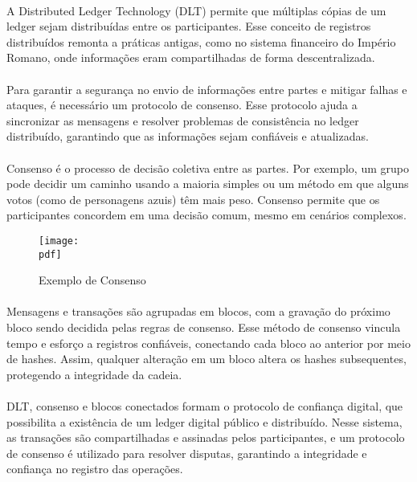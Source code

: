 \documentclass[letterpaper,11pt,leqno]{article}
\newcommand{\pdf}{figures/figures}
\begin{document}
\paragraph{}
A Distributed Ledger Technology (DLT) permite que múltiplas cópias de um ledger
sejam distribuídas entre os participantes. Esse conceito de registros
distribuídos remonta a práticas antigas, como no sistema financeiro do Império
Romano, onde informações eram compartilhadas de forma descentralizada.

\paragraph{}
Para garantir a segurança no envio de informações entre partes e mitigar falhas
e ataques, é necessário um protocolo de consenso. Esse protocolo ajuda a
sincronizar as mensagens e resolver problemas de consistência no ledger
distribuído, garantindo que as informações sejam confiáveis e atualizadas.

\paragraph{}
Consenso é o processo de decisão coletiva entre as partes. Por exemplo, um grupo
pode decidir um caminho usando a maioria simples ou um método em que alguns
votos (como de personagens azuis) têm mais peso. Consenso permite que os
participantes concordem em uma decisão comum, mesmo em cenários complexos.

\begin{figure}[H]
	{\texttt{[image: \\pdf]}}
	\caption{Exemplo de Consenso}
	\label{f:figure1}\end{figure}

\paragraph{}
Mensagens e transações são agrupadas em blocos, com a gravação do próximo bloco
sendo decidida pelas regras de consenso. Esse método de consenso vincula tempo e
esforço a registros confiáveis, conectando cada bloco ao anterior por meio de
hashes. Assim, qualquer alteração em um bloco altera os hashes subsequentes,
protegendo a integridade da cadeia.

\paragraph{}
DLT, consenso e blocos conectados formam o protocolo de confiança digital, que
possibilita a existência de um ledger digital público e distribuído. Nesse
sistema, as transações são compartilhadas e assinadas pelos participantes, e um
protocolo de consenso é utilizado para resolver disputas, garantindo a
integridade e confiança no registro das operações.
\end{document}
